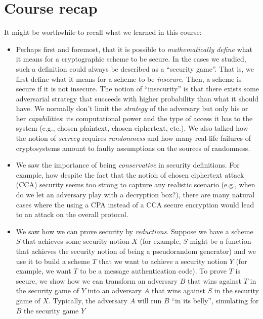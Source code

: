 \chapter{Course recap}\label{26-Course-recap}

It might be worthwhile to recall what we learned in this course:

\begin{itemize}
\item
  Perhaps first and foremost, that it is possible to
  \emph{mathematically define} what it means for a cryptographic scheme
  to be secure. In the cases we studied, such a definition could always
  be described as a ``security game''. That is, we first define what it
  means for a scheme to be \emph{insecure}. Then, a scheme is secure if
  it is not insecure. The notion of ``insecurity'' is that there exists
  some adversarial strategy that succeeds with higher probability than
  what it should have. We normally don't limit the \emph{strategy} of
  the adversary but only his or her \emph{capabilities}: its
  computational power and the type of access it has to the system (e.g.,
  chosen plaintext, chosen ciphertext, etc.). We also talked how the
  notion of \emph{secrecy} requires \emph{randomness} and how many
  real-life failures of cryptosystems amount to faulty assumptions on
  the sources of randomness.
\item
  We saw the importance of being \emph{conservative} in security
  definitions. For example, how despite the fact that the notion of
  chosen ciphertext attack (CCA) security seems too strong to capture
  any realistic scenario (e.g., when do we let an adversary play with a
  decryption box?), there are many natural cases where the using a CPA
  instead of a CCA secure encryption would lead to an attack on the
  overall protocol.
\item
  We saw how we can prove security by \emph{reductions}. Suppose we have
  a scheme \(S\) that achieves some security notion \(X\) (for example,
  \(S\) might be a function that achieves the security notion of being a
  pseudorandom generator) and we use it to build a scheme \(T\) that we
  want to achieve a security notion \(Y\) (for example, we want \(T\) to
  be a message authentication code). To prove \(T\) is secure, we show
  how we can transform an adversary \(B\) that wins against \(T\) in the
  security game of \(Y\) into an adversary \(A\) that wins against \(S\)
  in the security game of \(X\). Typically, the adversary \(A\) will run
  \(B\) ``in its belly'', simulating for \(B\) the security game \(Y\)

\end{itemize}
